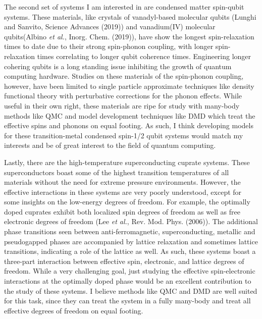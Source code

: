 \documentclass{article}
\begin{document}
The second set of systems I am interested in are condensed matter spin-qubit systems.
These materials, like crystals of vanadyl-based molecular qubits (Lunghi and Sanvito, Science Advances (2019)) and vanadium(IV) molecular qubits(Albino \textit{et al.}, Inorg. Chem. (2019)),  have show the longest spin-relaxation times to date due to their strong spin-phonon coupling, with longer spin-relaxation times correlating to longer qubit coherence times.
Engineering longer cohering qubits is a long standing issue inhibiting the growth of quantum computing hardware.
Studies on these materials of the spin-phonon coupling, however, have been limited to single particle approximate techniques like density functional theory with perturbative corrections for the phonon effects.
While useful in their own right, these materials are ripe for study with many-body methods like QMC and model development techniques like DMD which treat the effective spins and phonons on equal footing.
As such, I think developing models for these transition-metal condensed spin-1/2 qubit systems would match my interests and be of great interest to the field of quantum computing.

Lastly, there are the high-temperature superconducting cuprate systems.
These superconductors boast some of the highest transition temperatures of all materials without the need for extreme pressure environments.
However, the effective interactions in these systems are very poorly understood, except for some insights on the low-energy degrees of freedom.
For example, the optimally doped cuprates exhibit both localized spin degrees of freedom as well as free electronic degrees of freedom (Lee \textit{et al.}, Rev. Mod. Phys. (2006)).
The additional phase transitions seen between anti-ferromagnetic, superconducting, metallic and pseudogapped phases are accompanied by lattice relaxation and sometimes lattice transitions, indicating a role of the lattice as well.
As such, these systems boast a three-part interaction between effective spin, electronic, and lattice degrees of freedom.
While a very challenging goal,  just studying the effective spin-electronic interactions at the optimally doped phase would be an excellent contribution to the study of these systems.
I believe methods like QMC and DMD are well suited for this task, since they can treat the system in a fully many-body and treat all effective degrees of freedom on equal footing.
\end{document}
